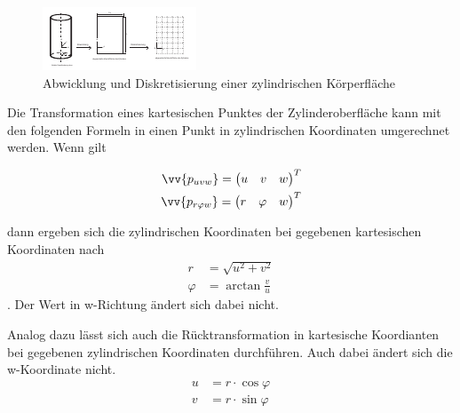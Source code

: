 \begin{figure}[h]
	\centering
	
	\includegraphics[width=0.8\linewidth]{img/discretzylinder.pdf}
	
	\caption{Abwicklung und Diskretisierung einer zylindrischen Körperfläche}
	\label{fig:discretzylinder}
	
\end{figure}

Die Transformation eines kartesischen Punktes der Zylinderoberfläche kann mit den folgenden Formeln in einen Punkt in zylindrischen Koordinaten umgerechnet werden.
Wenn gilt 
\begin{singlespace}
 \begin{equation}
 	\begin{aligned}
	 	\vv{p_{uvw}} = \begin{pmatrix}
	 	u & v & w
	 	\end{pmatrix}^T \\
	 	\vv{p_{r\varphi w}} = \begin{pmatrix}
	 	r & \varphi & w
	 	\end{pmatrix}^T	 	 	
	 \end{aligned}
 \end{equation}
\end{singlespace}
dann ergeben sich die zylindrischen Koordinaten bei gegebenen kartesischen Koordinaten nach
\begin{equation}	
	\begin{aligned}
		r &= \sqrt{u^2 + v^2} \\
		\varphi &= {\arctan{\frac{v}{u}}}
	\end{aligned}	
\end{equation}. Der Wert in w-Richtung ändert sich dabei nicht.

Analog dazu lässt sich auch die Rücktransformation in kartesische Koordianten bei gegebenen zylindrischen Koordinaten durchführen. Auch dabei ändert sich die w-Koordinate nicht.
\begin{equation}\label{eq:cyl2uvw}	
	\begin{aligned}
		u &= r \cdot \cos{\varphi}  \\
		v &= r \cdot \sin{\varphi}
	\end{aligned}	
\end{equation}

